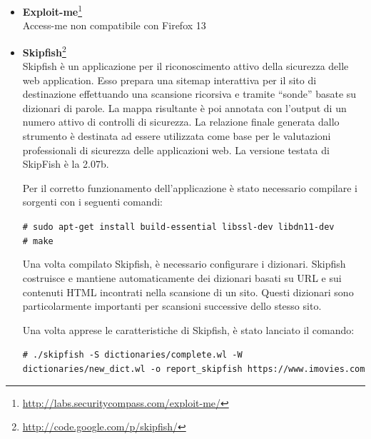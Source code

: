 \documentclass{article}
\begin{document}
\begin{itemize}
Sono state individuate in tutto 57 vulnerabilità.
Ognuna delle vulnerabilità segnala che, ad una richiesta particolare, il server ha risposto con un codice d'errore \emph{500}\footnote{Questo codice d'errore indica un errore generico avvenuto sul server a seguito di una richiesta impossibile da risolvere(Internal server error).}.

\item \textbf{Exploit-me}\footnote{\url{http://labs.securitycompass.com/exploit-me/}}\\
Access-me non compatibile con Firefox 13
\item \textbf{Skipfish}\footnote{\url{http://code.google.com/p/skipfish/}}\\
Skipfish è un applicazione per il riconoscimento attivo della sicurezza delle web application. Esso prepara una sitemap interattiva per il sito di destinazione effettuando una scansione ricorsiva e tramite ``sonde'' basate su dizionari di parole. La mappa risultante è poi annotata con l'output di un numero attivo di controlli di sicurezza. La relazione finale generata dallo strumento è destinata ad essere utilizzata come base per le valutazioni professionali di sicurezza delle applicazioni web. La versione testata di SkipFish è la 2.07b.

Per il corretto funzionamento dell'applicazione è stato necessario compilare i sorgenti con i seguenti comandi:

\small
{\tt  \# sudo apt-get install build-essential libssl-dev libdn11-dev\\
\# make\\
}

Una volta compilato Skipfish, è necessario configurare i dizionari.
Skipfish costruisce e mantiene automaticamente dei dizionari basati su URL e sui contenuti HTML incontrati nella scansione di un sito.
Questi dizionari sono particolarmente importanti per scansioni successive dello stesso sito.

Una volta apprese le caratteristiche di Skipfish, è stato lanciato il comando:

\small
{\tt \# ./skipfish -S dictionaries/complete.wl -W dictionaries/new\_dict.wl -o report\_skipfish https://www.imovies.com
}


\end{itemize}
\end{document}
